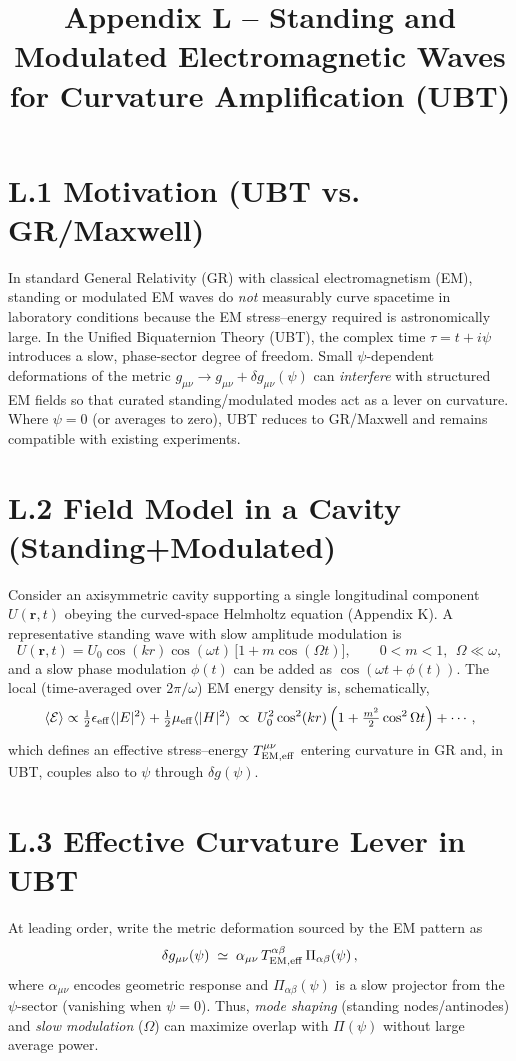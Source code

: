\documentclass[12pt]{article}
\title{Appendix L -- Standing and Modulated Electromagnetic Waves for Curvature Amplification (UBT)}
\date{}
\begin{document}
\maketitle

\section*{L.1 Motivation (UBT vs. GR/Maxwell)}
In standard General Relativity (GR) with classical electromagnetism (EM), standing or modulated EM waves do \emph{not} measurably curve spacetime in laboratory conditions because the EM stress--energy required is astronomically large.
In the Unified Biquaternion Theory (UBT), the complex time $\tau=t+i\psi$ introduces a slow, phase-sector degree of freedom. 
Small $\psi$-dependent deformations of the metric $g_{\mu\nu}\!\to g_{\mu\nu}+\delta g_{\mu\nu}(\psi)$ can \emph{interfere} with structured EM fields so that curated standing/modulated modes act as a lever on curvature.
Where $\psi\!=\!0$ (or averages to zero), UBT reduces to GR/Maxwell and remains compatible with existing experiments.

\section*{L.2 Field Model in a Cavity (Standing+Modulated)}
Consider an axisymmetric cavity supporting a single longitudinal component $U(\mathbf{r},t)$ obeying the curved-space Helmholtz equation (Appendix K).
A representative standing wave with slow amplitude modulation is
\begin{equation}
U(\mathbf{r},t)=U_0 \cos(kr)\cos(\omega t)\,\bigl[1+m\cos(\Omega t)\bigr],\qquad 0<m<1,\ \ \Omega\ll \omega,
\end{equation}
and a slow phase modulation $\phi(t)$ can be added as $\cos(\omega t+\phi(t))$.
The local (time-averaged over $2\pi/\omega$) EM energy density is, schematically,
\begin{equation}
\langle \mathcal{E}\rangle \propto \tfrac{1}{2}\epsilon_{\rm eff} \langle |E|^2\rangle + \tfrac{1}{2}\mu_{\rm eff} \langle |H|^2\rangle \;\propto\; U_0^2 \cos^2(kr)\,\Bigl(1+\tfrac{m^2}{2}\cos^2\Omega t\Bigr)+\cdots,
\end{equation}
which defines an effective stress--energy $T^{\mu\nu}_{\rm EM,eff}$ entering curvature in GR and, in UBT, couples also to $\psi$ through $\delta g(\psi)$.

\section*{L.3 Effective Curvature Lever in UBT}
At leading order, write the metric deformation sourced by the EM pattern as
\begin{equation}
\delta g_{\mu\nu}(\psi) \;\simeq\; \alpha_{\mu\nu}\, T^{\alpha\beta}_{\rm EM,eff}\, \Pi_{\alpha\beta}(\psi)\,,
\end{equation}
where $\alpha_{\mu\nu}$ encodes geometric response and $\Pi_{\alpha\beta}(\psi)$ is a slow projector from the $\psi$-sector (vanishing when $\psi\!=\!0$).
Thus, \emph{mode shaping} (standing nodes/antinodes) and \emph{slow modulation} ($\Omega$) can maximize overlap with $\Pi(\psi)$ without large average power.
\end{document}

